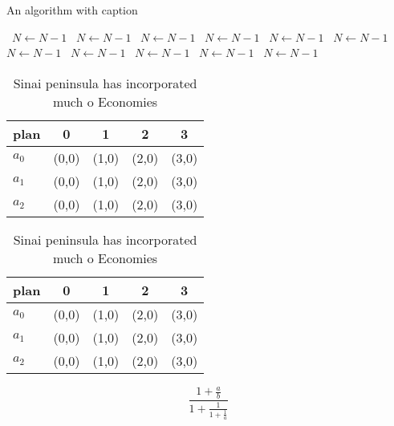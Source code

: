 \documentclass[a4paper]{article}
\begin{document}
\begin{algorithm}
\caption{An algorithm with caption}
\begin{algorithmic}
\    \State $N \gets N - 1$
\    \State $N \gets N - 1$
\    \State $N \gets N - 1$
\    \State $N \gets N - 1$
\    \State $N \gets N - 1$
\    \State $N \gets N - 1$
\    \State $N \gets N - 1$
\    \State $N \gets N - 1$
\    \State $N \gets N - 1$
\    \State $N \gets N - 1$
\    \State $N \gets N - 1$
\EndWhile
\end{algorithmic}
\end{algorithm}

\begin{table}
\begin{adjustbox}{width=0.6\columnwidth}
\begin{tabular}{|l|l|l|l|l|}
\hline
\textbf{plan} & \multicolumn{1}{c|}{\textbf{0}} & \multicolumn{1}{c|}{\textbf{1}} & \multicolumn{1}{c|}{\textbf{2}} & \multicolumn{1}{c|}{\textbf{3}} \\ \hline
\textbf{$a_0$}  & (0,0) & (1,0) & (2,0) & (3,0) \\ \hline
\textbf{$a_1$}  & (0,0) & (1,0) & (2,0) & (3,0) \\ \hline
\textbf{$a_2$}  & (0,0) & (1,0) & (2,0) & (3,0) \\ \hline
\end{tabular}
\end{adjustbox}
\caption{Sinai peninsula has incorporated much o Economies
}
\end{table}

\begin{table}
\begin{adjustbox}{width=0.6\columnwidth}
\begin{tabular}{|l|l|l|l|l|}
\hline
\textbf{plan} & \multicolumn{1}{c|}{\textbf{0}} & \multicolumn{1}{c|}{\textbf{1}} & \multicolumn{1}{c|}{\textbf{2}} & \multicolumn{1}{c|}{\textbf{3}} \\ \hline
\textbf{$a_0$}  & (0,0) & (1,0) & (2,0) & (3,0) \\ \hline
\textbf{$a_1$}  & (0,0) & (1,0) & (2,0) & (3,0) \\ \hline
\textbf{$a_2$}  & (0,0) & (1,0) & (2,0) & (3,0) \\ \hline
\end{tabular}
\end{adjustbox}
\caption{Sinai peninsula has incorporated much o Economies
}
\end{table}

\[ \frac{1+\frac{a}{b}}{1+\frac{1}{1+\frac{1}{a}}} \]
\end{document}
